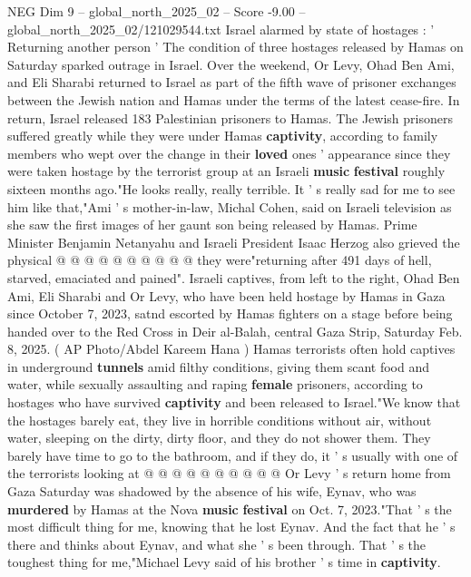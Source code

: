 \begin{textsample}{NEG Dim 9 – global\_north\_2025\_02 – Score -9.00 – global\_north\_2025\_02/121029544.txt}  \label{ex:f9_neg_056}
Israel alarmed by state of hostages : ' Returning another person ' The condition of three hostages released by Hamas on Saturday sparked outrage in Israel.
Over the weekend, Or Levy, Ohad Ben Ami, and Eli Sharabi returned to Israel as part of the fifth wave of prisoner exchanges between the Jewish nation and Hamas under the terms of the latest cease-fire.
In return, Israel released 183 Palestinian prisoners to Hamas.
The Jewish prisoners suffered greatly while they were under Hamas \textbf{captivity}, according to family members who wept over the change in their \textbf{loved} ones ' appearance since they were taken hostage by the terrorist group at an Israeli \textbf{music} \textbf{festival} roughly sixteen months ago."He looks really, really terrible.
It ' s really sad for me to see him like that,"Ami ' s mother-in-law, Michal Cohen, said on Israeli television as she saw the first images of her gaunt son being released by Hamas.
Prime Minister Benjamin Netanyahu and Israeli President Isaac Herzog also grieved the physical @ @ @ @ @ @ @ @ @ @ they were"returning after 491 days of hell, starved, emaciated and pained".
Israeli captives, from left to the right, Ohad Ben Ami, Eli Sharabi and Or Levy, who have been held hostage by Hamas in Gaza since October 7, 2023, satnd escorted by Hamas fighters on a stage before being handed over to the Red Cross in Deir al-Balah, central Gaza Strip, Saturday Feb. 8, 2025. ( AP Photo/Abdel Kareem Hana ) Hamas terrorists often hold captives in underground \textbf{tunnels} amid filthy conditions, giving them scant food and water, while sexually assaulting and raping \textbf{female} prisoners, according to hostages who have survived \textbf{captivity} and been released to Israel."We know that the hostages barely eat, they live in horrible conditions without air, without water, sleeping on the dirty, dirty floor, and they do not shower them.
They barely have time to go to the bathroom, and if they do, it ' s usually with one of the terrorists looking at @ @ @ @ @ @ @ @ @ @ Or Levy ' s return home from Gaza Saturday was shadowed by the absence of his wife, Eynav, who was \textbf{murdered} by Hamas at the Nova \textbf{music} \textbf{festival} on Oct. 7, 2023."That ' s the most difficult thing for me, knowing that he lost Eynav.
And the fact that he ' s there and thinks about Eynav, and what she ' s been through.
That ' s the toughest thing for me,"Michael Levy said of his brother ' s time in \textbf{captivity}.

\end{textsample}
